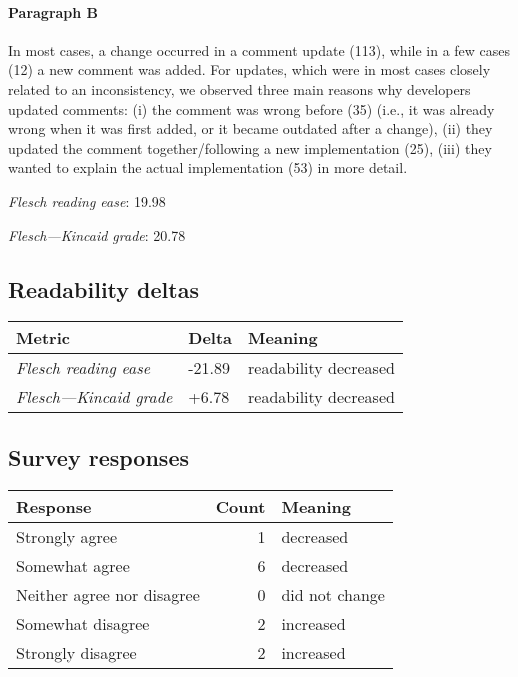 \paragraph{Paragraph B}
In most cases, a change occurred in a comment update (113), while in a few cases (12) a new comment was added. For updates, which were in most cases closely related to an inconsistency, we observed three main reasons why developers updated comments: (i) the comment was wrong before (35) (i.e., it was already wrong when it was first added, or it became outdated after a change), (ii) they updated the comment together/following a new implementation (25), (iii) they wanted to explain the actual implementation (53) in more detail.\par\medskip
\emph{Flesch reading ease}: 19.98\par
\emph{Flesch---Kincaid grade}: 20.78

\subsection{Readability deltas}

\begin{tabular}{lll}
\toprule
               \textbf{Metric} & \textbf{Delta} &       \textbf{Meaning} \\
\midrule
    \emph{Flesch reading ease} &         -21.89 &  readability decreased \\
 \emph{Flesch---Kincaid grade} &          +6.78 &  readability decreased \\
\bottomrule
\end{tabular}

\subsection{Survey responses}
\begin{tabular}{lrl}
\toprule
          \textbf{Response} &  \textbf{Count} & \textbf{Meaning} \\
\midrule
             Strongly agree &               1 &        decreased \\
             Somewhat agree &               6 &        decreased \\
 Neither agree nor disagree &               0 &   did not change \\
          Somewhat disagree &               2 &        increased \\
          Strongly disagree &               2 &        increased \\
\bottomrule
\end{tabular}

